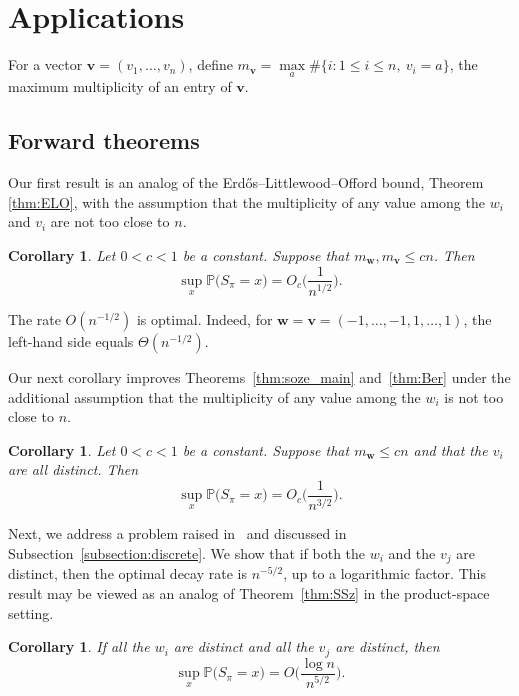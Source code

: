 \documentclass[reqno]{amsart}
\renewcommand\P{{\mathbb{P}}}
\newcommand\BMv{{\bm v}}
\newcommand\BMw{{\bm w}}
\theoremstyle{plain}
\newtheorem{corollary}[theorem]{Corollary}
\theoremstyle{definition}
\begin{document}
\section{Applications}\label{section:applications}

For a vector $\BMv=(v_1,\dots,v_n)$, define
$m_{\BMv}=\max\limits_a \#\{i:1\le i\le n,\ v_i=a\}$,
the maximum multiplicity of an entry of $\BMv$.

\subsection{Forward theorems}

Our first result is an analog of the Erd\H{o}s--Littlewood--Offord bound, Theorem \ref{thm:ELO}, with the assumption that the multiplicity of any value among the $w_i$ and $v_{i}$ are not too close to $n$.

\begin{corollary}\label{thm:discrete:1/2}
Let $0<c<1$ be a constant. Suppose that $m_{\BMw}, m_{\BMv} \le cn$.
Then
\[
\sup_{x}\P\bigl(S_{\pi}=x\bigr)
= O_{c}\Big(\frac{1}{n^{1/2}}\Big).
\]
\end{corollary}

The rate $O(n^{-1/2})$ is optimal. Indeed, for $\BMw=\BMv=(-1,\dots, -1,1,\dots, 1)$, the left-hand side equals $\Theta(n^{-1/2})$.

Our next corollary improves Theorems~\ref{thm:soze_main}
and~\ref{thm:Ber} under the additional assumption that the multiplicity of any
value among the $w_i$ is not too close to $n$.

\begin{corollary}\label{thm:discrete:3/2}
Let $0<c<1$ be a constant. Suppose that
$m_{\BMw} \le cn$ and that the $v_i$ are all distinct. Then
\[
\sup_{x}\P\bigl(S_{\pi}=x\bigr)
= O_{c}\Big(\frac{1}{n^{3/2}}\Big).
\]
\end{corollary}

Next, we address a problem raised in~\cite{APZ} and discussed in
Subsection~\ref{subsection:discrete}. We show that if both the $w_i$ and the
$v_j$ are distinct, then the optimal decay rate is $n^{-5/2}$, up to a
logarithmic factor. This result may be viewed as an analog of
Theorem~\ref{thm:SSz} in the product-space setting.

\begin{corollary}\label{thm:discrete:5/2}
If all the $w_i$ are distinct and all the $v_j$ are distinct, then
\[
\sup_{x}\P\bigl(S_{\pi}=x\bigr)
= O\Big(\frac{\log n}{n^{5/2}}\Big).
\]
\end{corollary}
\end{document}
